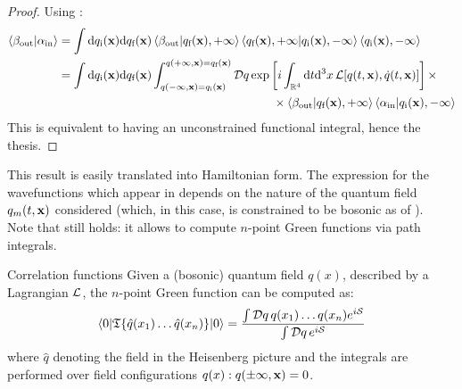 \begin{proofbox}
  \begin{proof}
    Using :
    \begin{equation*}
      \begin{split}
        \braket{\beta_\text{out} | \alpha_\text{in}}
        & = \int \mathrm{d} q_\text{i}(\mathbf{x}) \mathrm{d} q_\text{f}(\mathbf{x}) \braket{\beta_\text{out} | q_\text{f}(\mathbf{x}), +\infty} \braket{q_\text{f}(\mathbf{x}),+\infty | q_\text{i}(\mathbf{x}),-\infty} \braket{q_\text{i}(\mathbf{x}), -\infty} \\
        & = \int \mathrm{d} q_\text{i}(\mathbf{x}) \mathrm{d} q_\text{f}(\mathbf{x}) \int_{q(-\infty,\mathbf{x}) = q_\text{i}(\mathbf{x})}^{q(+\infty,\mathbf{x}) = q_\text{f}(\mathbf{x})} \mathcal{D}q \exp \left[ i \int_{\mathbb{R}^4} \mathrm{d} t \mathrm{d}^3 x\, \mathcal{L}[q(t,\mathbf{x}),\dot{q}(t,\mathbf{x})] \right] \times \\
        & \qquad \qquad \qquad \qquad \qquad \qquad \qquad \qquad \qquad \times \braket{\beta_\text{out} | q_\text{f}(\mathbf{x}), +\infty} \braket{\alpha_\text{in} | q_\text{i}(\mathbf{x}), -\infty}
      \end{split}
    \end{equation*}
    This is equivalent to having an unconstrained functional integral, hence the thesis.
  \end{proof}
\end{proofbox}

This result is easily translated into Hamiltonian form. The expression for the wavefunctions which appear in  depends on the nature of the quantum field $ q_m(t,\mathbf{x}) $ considered (which, in this case, is constrained to be bosonic as of ). \\
Note that  still holds: it allows to compute $ n $-point Green functions via path integrals.

\begin{proposition}{Correlation functions}{}
  Given a (bosonic) quantum field $ q(x) $, described by a Lagrangian $ \mathcal{L} $, the $ n $-point Green function can be computed as:
  \begin{equation}
    \braket{0 | \mathfrak{T}\{\hat{q}(x_1) \dots \hat{q}(x_n)\} | 0} = \frac{\int \mathcal{D}q\, q(x_1) \dots q(x_n) e^{i \mathcal{S}}}{\int \mathcal{D}q\, e^{i \mathcal{S}}}
  \end{equation}
  where $ \hat{q} $ denoting the field in the Heisenberg picture and the integrals are performed over field configurations $ q(x) : q(\pm \infty, \mathbf{x}) = 0 $.
\end{proposition}

